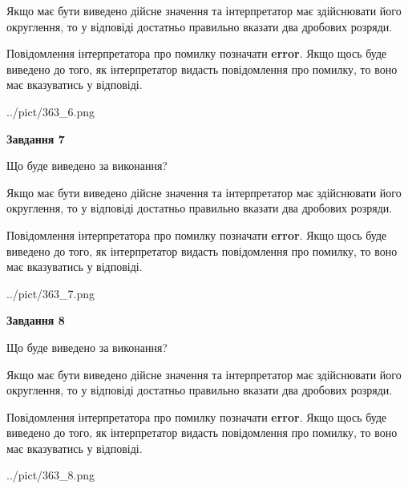 \documentclass[12pt, ukrainian]{article}
\begin{document}
{\begin {Large}
Якщо має бути виведено дійсне значення та інтерпретатор має здійснювати його округлення, 
то у відповіді достатньо правильно вказати два дробових розряди.

Повідомлення інтерпретатора про помилку позначати \textbf{error}.
Якщо щось буде виведено до того, як інтерпретатор видасть повідомлення про помилку, 
то воно має вказуватись у відповіді. \par

\begin{center}
	{../pict/363_6.png}
\end{center}
\newpage

{\begin {center}\textbf{Завдання 7}\end {center}}\par
Що буде виведено за виконання? \par

Якщо має бути виведено дійсне значення та інтерпретатор має здійснювати його округлення, 
то у відповіді достатньо правильно вказати два дробових розряди.

Повідомлення інтерпретатора про помилку позначати \textbf{error}.
Якщо щось буде виведено до того, як інтерпретатор видасть повідомлення про помилку, 
то воно має вказуватись у відповіді. \par

\begin{center}
	{../pict/363_7.png}
\end{center}
\newpage

{\begin {center}\textbf{Завдання 8}\end {center}}\par
Що буде виведено за виконання? \par

Якщо має бути виведено дійсне значення та інтерпретатор має здійснювати його округлення, 
то у відповіді достатньо правильно вказати два дробових розряди.

Повідомлення інтерпретатора про помилку позначати \textbf{error}.
Якщо щось буде виведено до того, як інтерпретатор видасть повідомлення про помилку, 
то воно має вказуватись у відповіді. \par

\begin{center}
	{../pict/363_8.png}
\end{center}
\newpage


\end{Large}}
\end{document}
